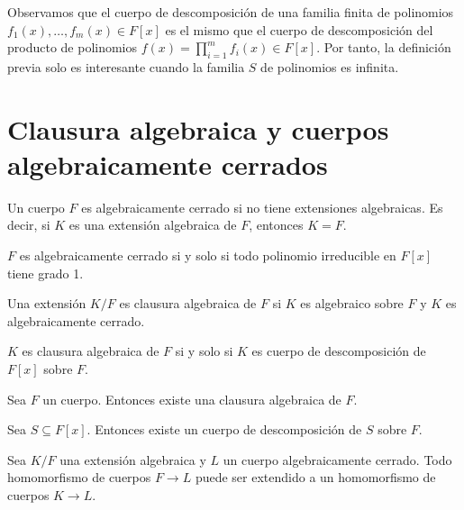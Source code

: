 \begin{remark}
    Observamos que el cuerpo de descomposición de una familia finita de polinomios $f_1(x), \dots, f_m(x) \in F[x]$ es el mismo que el cuerpo de descomposición del producto de polinomios $f(x) = \prod_{i = 1}^m f_i(x) \in F[x]$.
    Por tanto, la definición previa solo es interesante cuando la familia $S$ de polinomios es infinita.
\end{remark}

\section{Clausura algebraica y cuerpos algebraicamente cerrados}

\begin{definition}
    Un cuerpo $F$ es algebraicamente cerrado si no tiene extensiones algebraicas.
    Es decir, si $K$ es una extensión algebraica de $F$, entonces $K = F$.
\end{definition}

\begin{proposition}
    $F$ es algebraicamente cerrado si y solo si todo polinomio irreducible en $F[x]$ tiene grado 1.
\end{proposition}

\begin{definition}
    Una extensión $K/F$ es clausura algebraica de $F$ si $K$ es algebraico sobre $F$ y $K$ es algebraicamente cerrado.
\end{definition}

\begin{proposition}
    $K$ es clausura algebraica de $F$ si y solo si $K$ es cuerpo de descomposición de $F[x]$ sobre $F$.
\end{proposition}

\begin{theorem}
    Sea $F$ un cuerpo. Entonces existe una clausura algebraica de $F$.
\end{theorem}

\begin{corollary}
    Sea $S \subseteq F[x]$. Entonces existe un cuerpo de descomposición de $S$ sobre $F$.
\end{corollary}

\begin{theorem}
    Sea $K/F$ una extensión algebraica y $L$ un cuerpo algebraicamente cerrado.
    Todo homomorfismo de cuerpos $F \to L$ puede ser extendido a un homomorfismo de cuerpos $K \to L$.
\end{theorem}


